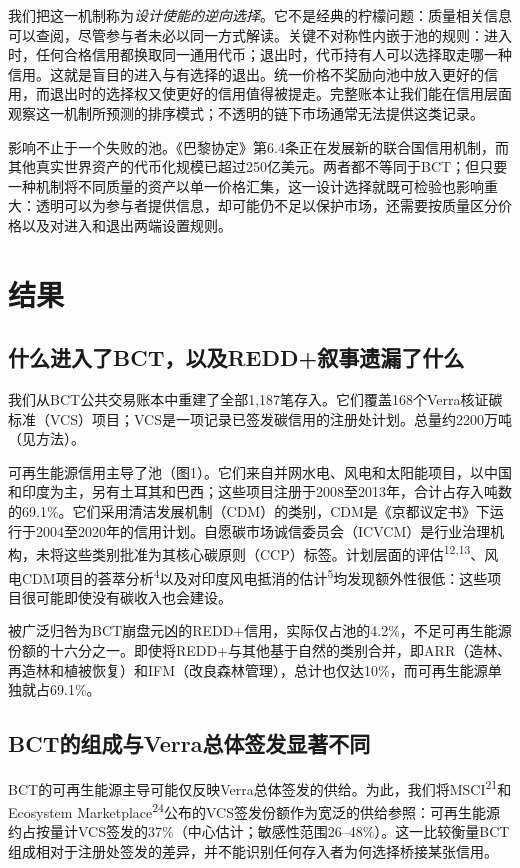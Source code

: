 \documentclass[12pt,a4paper]{article}
\begin{document}
我们把这一机制称为\textit{设计使能的逆向选择}。它不是经典的柠檬问题：质量相关信息可以查阅，尽管参与者未必以同一方式解读。关键不对称性内嵌于池的规则：进入时，任何合格信用都换取同一通用代币；退出时，代币持有人可以选择取走哪一种信用。这就是盲目的进入与有选择的退出。统一价格不奖励向池中放入更好的信用，而退出时的选择权又使更好的信用值得被提走。完整账本让我们能在信用层面观察这一机制所预测的排序模式；不透明的链下市场通常无法提供这类记录。

影响不止于一个失败的池。《巴黎协定》第6.4条正在发展新的联合国信用机制，而其他真实世界资产的代币化规模已超过250亿美元。两者都不等同于BCT；但只要一种机制将不同质量的资产以单一价格汇集，这一设计选择就既可检验也影响重大：透明可以为参与者提供信息，却可能仍不足以保护市场，还需要按质量区分价格以及对进入和退出两端设置规则。

\section*{结果}
\subsection*{什么进入了BCT，以及REDD+叙事遗漏了什么}

我们从BCT公共交易账本中重建了全部1,187笔存入。它们覆盖168个Verra核证碳标准（VCS）项目；VCS是一项记录已签发碳信用的注册处计划。总量约2200万吨（见方法）。

可再生能源信用主导了池（图1）。它们来自并网水电、风电和太阳能项目，以中国和印度为主，另有土耳其和巴西；这些项目注册于2008至2013年，合计占存入吨数的69.1\%。它们采用清洁发展机制（CDM）的类别，CDM是《京都议定书》下运行于2004至2020年的信用计划。自愿碳市场诚信委员会（ICVCM）是行业治理机构，未将这些类别批准为其核心碳原则（CCP）标签。计划层面的评估\textsuperscript{12,13}、风电CDM项目的荟萃分析\textsuperscript{4}以及对印度风电抵消的估计\textsuperscript{5}均发现额外性很低：这些项目很可能即使没有碳收入也会建设。



被广泛归咎为BCT崩盘元凶的REDD+信用，实际仅占池的4.2\%，不足可再生能源份额的十六分之一。即使将REDD+与其他基于自然的类别合并，即ARR（造林、再造林和植被恢复）和IFM（改良森林管理），总计也仅达10\%，而可再生能源单独就占69.1\%。


\subsection*{BCT的组成与Verra总体签发显著不同}

BCT的可再生能源主导可能仅反映Verra总体签发的供给。为此，我们将MSCI\textsuperscript{21}和Ecosystem Marketplace\textsuperscript{24}公布的VCS签发份额作为宽泛的供给参照：可再生能源约占按量计VCS签发的37\%（中心估计；敏感性范围26--48\%）。这一比较衡量BCT组成相对于注册处签发的差异，并不能识别任何存入者为何选择桥接某张信用。
\end{document}
